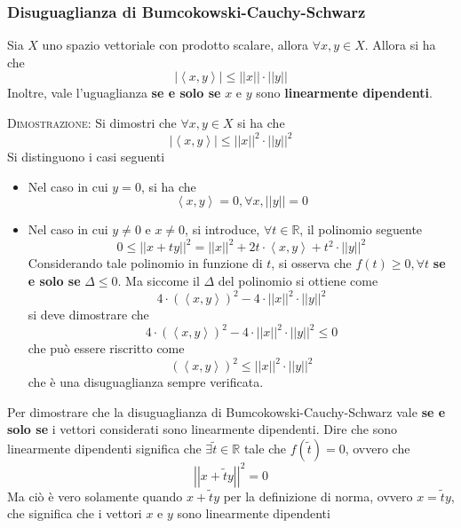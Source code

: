 \documentclass[a4paper]{extarticle}
\begin{document}
\vspace{1em}
\subsubsection{Disuguaglianza di Bumcokowski-Cauchy-Schwarz}
Sia $X$ uno spazio vettoriale con prodotto scalare, allora $\forall x,y \in X$. Allora si ha che
\[\left \vert \left<x,y\right> \right \vert \leq \left \vert \left \vert x \right \vert \right \vert \cdot \left \vert \left \vert y \right \vert \right \vert\]
Inoltre, vale l'uguaglianza \textbf{se e solo se} $x$ e $y$ sono \textbf{linearmente dipendenti}.

\vspace{2em}
\noindent
\normalfont \normalsize
\textsc{Dimostrazione}: Si dimostri che $\forall x, y \in X$ si ha che
\[\left \vert \left<x,y\right> \right \vert \leq \left \vert \left \vert x \right \vert \right \vert^2 \cdot \left \vert \left \vert y \right \vert \right \vert^2\]
Si distinguono i casi seguenti
\begin{itemize}
    \item Nel caso in cui $y=0$, si ha che
    \[\left<x,y\right>=0, \forall x, \left \vert \left \vert y \right \vert \right \vert = 0\]
    \item Nel caso in cui $y \neq 0$ e $x \neq 0$, si introduce, $\forall t \in \mathbb{R}$, il polinomio seguente
    \[0 \leq \left \vert \left \vert x + ty \right \vert \right \vert^2 = \left \vert \left \vert x \right \vert \right \vert^2 + 2t \cdot \left<x,y\right> + t^2 \cdot \left \vert \left \vert y \right \vert \right \vert^2\]
    Considerando tale polinomio in funzione di $t$, si osserva che $f(t) \geq 0, \forall t$ \textbf{se e solo se} $\Delta \leq 0$.
    Ma siccome il $\Delta$ del polinomio si ottiene come
    \[4 \cdot \left(\left<x,y\right>\right)^2 - 4 \cdot \left \vert \left \vert x \right \vert \right \vert^2 \cdot \left \vert \left \vert y \right \vert \right \vert^2\]
    si deve dimostrare che
    \[4 \cdot \left(\left<x,y\right>\right)^2 - 4 \cdot \left \vert \left \vert x \right \vert \right \vert^2 \cdot \left \vert \left \vert y \right \vert \right \vert^2 \leq 0\]
    che può essere riscritto come
    \[\left(\left<x,y\right>\right)^2 \leq \left \vert \left \vert x \right \vert \right \vert^2 \cdot \left \vert \left \vert y \right \vert \right \vert^2\]
    che è una disuguaglianza sempre verificata.
\end{itemize}
Per dimostrare che la disuguaglianza di Bumcokowski-Cauchy-Schwarz vale \textbf{se e solo se} i vettori considerati sono linearmente dipendenti. Dire che sono linearmente dipendenti significa che $\exists \tilde{t} \in \mathbb{R}$ tale che $f(\tilde{t})=0$, ovvero che
\[\left \vert \left \vert x+ \tilde{t}y \right \vert \right \vert^2 = 0\]
Ma ciò è vero solamente quando $x+ \tilde{t}y$ per la definizione di norma, ovvero $x=\tilde{t}y$, che significa che i vettori $x$ e $y$ sono linearmente dipendenti
\end{document}
